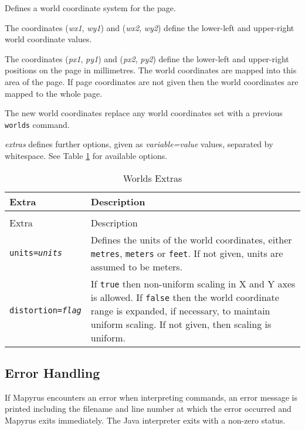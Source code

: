 Defines a world coordinate system for the page.

The coordinates
(\textit{wx1}, \textit{wy1}) 
and
(\textit{wx2}, \textit{wy2})
define the lower-left and upper-right world coordinate values.

The coordinates
(\textit{px1}, \textit{py1}) 
and
(\textit{px2}, \textit{py2})
define the lower-left and upper-right positions on the page
in millimetres.  The world coordinates are mapped into this area
of the page.  If page coordinates are not given then the world
coordinates are mapped to the whole page.

The new world coordinates replace any world coordinates
set with a previous \texttt{worlds} command.

\textit{extras} defines further options, given as
\textit{variable=value} values, separated by whitespace.
See Table \ref{worldsextras}
for available options.

\begin{longtable}{|l|p{7cm}|}
\hline
\label{worldsextras}
Extra & Description \\
\hline
\hline
\endfirsthead
\hline
\caption{Worlds Extras} \\
\endfoot

\hline
Extra & Description \\
\hline
\hline
\endhead

\texttt{units=\textit{units}} &

Defines the units of the world coordinates,
either \texttt{metres}, \texttt{meters} or \texttt{feet}.
If not given, units are assumed to be meters. \\

\texttt{distortion=\textit{flag}} &

If \texttt{true} then non-uniform scaling in X and Y axes
is allowed.  If \texttt{false} then
the world coordinate range is expanded,
if necessary, to maintain uniform scaling.
If not given, then scaling is uniform. \\

\hline
\end{longtable}

\subsection{Error Handling}

If Mapyrus encounters an error when interpreting commands,
an error message is printed including the filename and line number
at which the error occurred and Mapyrus exits immediately.
The Java interpreter exits with a non-zero status.

